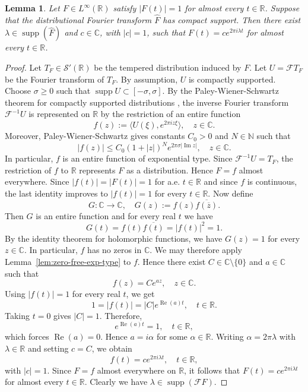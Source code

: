 \documentclass[reqno,a4paper,12pt]{amsart}
\numberwithin{equation}{section}
\newtheorem{lemma}[definition]{Lemma}
\def\R{{\mathbb R}}
\def\C{{\mathbb C}}
\newcommand{\ft}{{\mathcal{F}}}
\newcommand{\supp}{\operatorname{supp}}
\newcommand\1{\mathds{1}}
\begin{document}
\begin{lemma}\label{lem:bounded-unimodular-compact-spectrum}
Let $F\in L^\infty(\mathbb R)$ satisfy $|F(t)|=1$ for almost every $t\in\mathbb R$. Suppose that the distributional Fourier
transform $\widehat F$ has compact support. Then there exist
$\lambda\in\supp(\widehat F)$ and $c\in\mathbb C$, with $|c|=1$, such that $F(t)=ce^{2\pi i\lambda t}$ for almost every $t\in\mathbb R$.
\end{lemma}

\begin{proof}
Let $T_F \in \mathcal S'(\R)$ be the tempered distribution induced by $F$.
Let $U = \ft T_F$ be the Fourier transform of $T_F$.
By assumption, $U$ is compactly supported. Choose $\sigma\geq 0$ such that
$
        \operatorname{supp} U\subset [-\sigma,\sigma].
$
By the Paley-Wiener-Schwartz theorem for compactly supported distributions
\cite[Theorem 7.3.1]{H83}, the inverse Fourier transform
$\mathcal F^{-1}U$ is represented on $\mathbb R$ by the restriction of an entire function
$$
        f(z):=\big\langle U(\xi),e^{2\pi i z\xi}\big\rangle,
        \quad z\in\mathbb C.
$$
Moreover, Paley-Wiener-Schwartz gives constants $C_0>0$ and $N \in \mathbb N$ such
that
$$
        |f(z)|
        \leq
        C_0(1+|z|)^N e^{2\pi\sigma|\operatorname{Im}z|},
        \quad z\in\mathbb C .
$$
In particular, $f$ is an entire function of exponential type.
Since $\mathcal F^{-1}U=T_F$, the restriction of $f$ to $\mathbb R$
represents $F$ as a distribution. Hence $F=f$ almost everywhere. Since
$|f(t)|= |F(t)| = 1$ for a.e. $t\in\mathbb R$ and since $f$ is continuous, the last identity improves to $|f(t)|=1$ for every $t\in\mathbb R$.
Now define
$$
      G : \C \to \C, \quad  G(z):=f(z)\overline{f(\overline z)}.
$$
Then $G$ is an entire function and for every real $t$ we have
$$
        G(t)=f(t)\overline{f(t)}=|f(t)|^2=1.
$$
By the identity theorem for holomorphic functions, we have $G(z)= 1$ for every $z \in \C$.
In particular, $f$ has no zeros in $\mathbb C$.
We may therefore apply Lemma~\ref{lem:zero-free-exp-type} to $f$. Hence
there exist $C \in \mathbb C\setminus\{0\}$ and $a\in\mathbb C$ such that
$$
        f(z)=C e^{az},
        \quad z\in\mathbb C .
$$
Using $|f(t)|=1$ for every real $t$, we get
$$
        1=|f(t)|=|C|e^{\operatorname{Re}(a) t},
        \quad t\in\mathbb R .
$$
Taking $t=0$ gives $|C|=1$. Therefore,
$$
        e^{\operatorname{Re}(a)t}=1,
        \quad t\in\mathbb R,
$$
which forces $\operatorname{Re}(a)=0$. Hence $a=i\alpha$ for some
$\alpha\in\mathbb R$. Writing $\alpha=2\pi\lambda$ with $\lambda\in\mathbb R$ and setting $c=C$, we obtain
$$
        f(t)=ce^{2\pi i\lambda t},
        \quad t\in\mathbb R,
$$
with $|c|=1$. Since $F=f$ almost everywhere on $\mathbb R$, it follows
that
$
        F(t)=ce^{2\pi i\lambda t}
$
for almost every $t\in\mathbb R$. Clearly we have $\lambda \in \supp(\ft F)$.
\end{proof}
\end{document}
